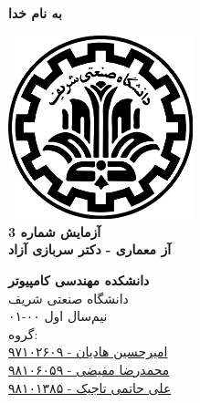 \documentclass{article}
\begin{document}
\begin{titlepage}
	\begin{center}
		\textbf{ \Huge{به نام خدا}}	
		\vspace{0.2cm}
		
		\includegraphics[width=0.4\textwidth]{sharif.png}\\
		\vspace{0.2cm}
		\textbf{ \Huge{آزمایش شماره 3}}\\
		\vspace{0.25cm}
		\textbf{ \Large{آز معماری - دکتر سربازی آزاد}}
		\vspace{0.2cm}
		
		
		\large \textbf{دانشکده مهندسی کامپیوتر}\\\vspace{0.1cm}
		\large   دانشگاه صنعتی شریف\\\vspace{0.2cm}
		\large   ﻧﯿﻢ‌سال اول ۰۰-۰۱ \\\vspace{0.10cm}
		\large{گروه:}\\
		\large{\href{mailto:a.h.hadian@gmail.com}{امیرحسین هادیان - ۹۷۱۰۲۶۰۹}}\\
		\large{\href{mailto:mofayezi.m@gmail.com}{محمدرضا مفیضی - ۹۸۱۰۶۰۵۹}}\\
		\large{\href{mailto:a.hatam008@gmail.com}{علی حاتمی تاجیک - ۹۸۱۰۱۳۸۵}}\\
	\end{center}
\end{titlepage}

\newpage

\pagestyle{fancy}
\fancyhf{}
\fancyfoot{}
\setlength{\headheight}{59pt}
\cfoot{\thepage}
\end{document}

